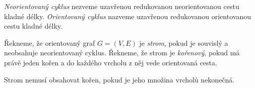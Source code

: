 \begin{definice}[Cyklus]
    \emph{Neorientovaný cyklus} nezveme uzavřenou redukovanou neorientovanou cestu kladné délky.
    \emph{Orientovaný cyklus} nazveme uzavřenou redukovanou orientovanou cestu kladné délky.
\end{definice}

\begin{definice}[Strom]
    Řekneme, že orientovaný graf $G=(V,E)$ je \emph{strom}, pokud je souvislý a neobsahuje neorientovaný cyklus. Řekneme, že strom je \emph{kořenový}, pokud má právě jeden kořen a do každého vrcholu z něj vede orientovaná cesta. 
\end{definice}
\begin{pozn}
    Strom nemusí obsahovat kořen, pokud je jeho množina vrcholů nekonečná. 
\end{pozn}

